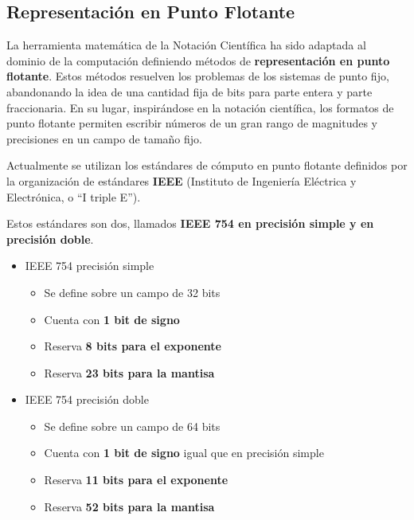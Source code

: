 \documentclass[spanish,a4paper,]{article}
\providecommand{\tightlist}{%
  \setlength{\itemsep}{0pt}\setlength{\parskip}{0pt}}
\begin{document}
\hypertarget{representaciuxf3n-en-punto-flotante}{%
\subsection{Representación en Punto
Flotante}\label{representaciuxf3n-en-punto-flotante}}

La herramienta matemática de la Notación Científica ha sido adaptada al
dominio de la computación definiendo métodos de \textbf{representación
en punto flotante}. Estos métodos resuelven los problemas de los
sistemas de punto fijo, abandonando la idea de una cantidad fija de bits
para parte entera y parte fraccionaria. En su lugar, inspirándose en la
notación científica, los formatos de punto flotante permiten escribir
números de un gran rango de magnitudes y precisiones en un campo de
tamaño fijo.

Actualmente se utilizan los estándares de cómputo en punto flotante
definidos por la organización de estándares \textbf{IEEE} (Instituto de
Ingeniería Eléctrica y Electrónica, o ``I triple E'').

Estos estándares son dos, llamados \textbf{IEEE 754 en precisión simple
y en precisión doble}.

\begin{itemize}
\tightlist
\item
  IEEE 754 precisión simple

  \begin{itemize}
  \tightlist
  \item
    Se define sobre un campo de 32 bits
  \item
    Cuenta con \textbf{1 bit de signo}
  \item
    Reserva \textbf{8 bits para el exponente}
  \item
    Reserva \textbf{23 bits para la mantisa}
  \end{itemize}
\item
  IEEE 754 precisión doble

  \begin{itemize}
  \tightlist
  \item
    Se define sobre un campo de 64 bits
  \item
    Cuenta con \textbf{1 bit de signo} igual que en precisión simple
  \item
    Reserva \textbf{11 bits para el exponente}
  \item
    Reserva \textbf{52 bits para la mantisa}
  \end{itemize}
\end{itemize}
\end{document}
